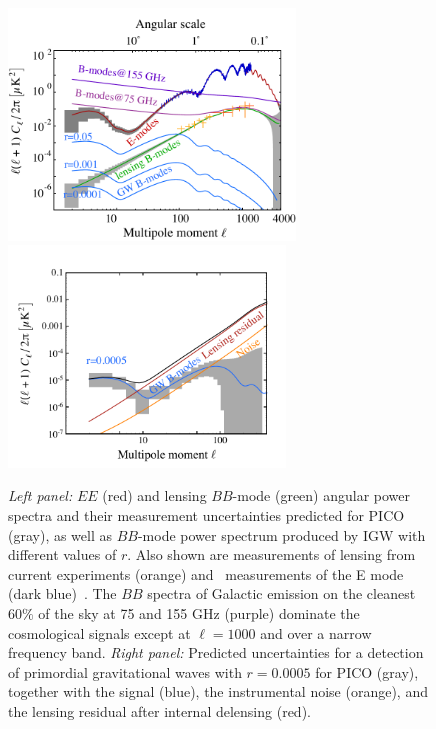 \documentclass[PICOReport.tex]{subfiles}
\begin{document}
\begin{figure}[!htb]
\centering
\hspace{-0.15in}
\includegraphics[width=3in]{images/cmb_powspec_PICOv4p1_v2.pdf}
\hspace{-0.15in}
\includegraphics[width=2.9in,trim= 0cm 0.2cm 0cm 0cm]{images/cmbbb_powspec_PICOv4p1.pdf}
\caption{{\em Left panel:} $EE$ (red) and lensing $BB$-mode (green) angular power spectra and their measurement uncertainties predicted for PICO (gray), as well as $BB$-mode power spectrum produced by \ac{IGW} with different values of $r$. Also shown are measurements of lensing from current experiments (orange) and \planck~measurements of the E mode (dark blue)~\citep{polar+,planck?}. The $BB$ spectra of Galactic emission on the cleanest $60\%$ of the sky at 75 and 155 GHz (purple) dominate the cosmological signals except at $\ell=1000$ and over a narrow frequency band. 
{\em Right panel:} Predicted uncertainties for a detection of primordial gravitational waves with $r=0.0005$ for PICO (gray), together with the signal (blue), the instrumental noise (orange), and the lensing residual after internal delensing (red).}
\label{fig:clbb}
\end{figure}
\end{document}
